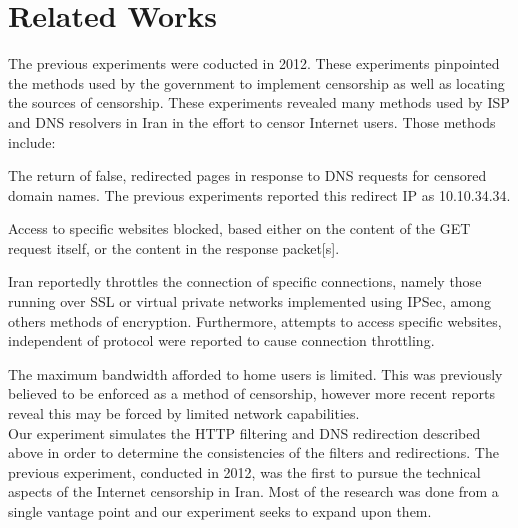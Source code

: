 \section{Related Works}\label{sec:relatedworks}

The previous experiments were coducted in 2012. These experiments pinpointed the methods used by the government to implement censorship as well as locating the sources of censorship. These experiments revealed many methods used by ISP and DNS resolvers in Iran in the effort to censor Internet users. Those methods include:


\item[DNS Redirection:] The return of false, redirected pages in response to DNS requests for censored domain names. The previous experiments reported this redirect IP as 10.10.34.34.\\
\item[HTTP Filtering:] Access to specific websites blocked, based either on the content of the GET request itself, or the content in the response packet[s].\\
\item[Connection Throttling:] Iran reportedly throttles the connection of specific connections, namely those running over SSL or virtual private networks implemented using IPSec, among others methods of encryption. Furthermore, attempts to access specific websites, independent of protocol were reported to cause connection throttling.\\
\item[Broadband Speed Limitations:] The maximum bandwidth afforded to home user\’s is limited. This was previously believed to be enforced as a method of censorship, however more recent reports reveal this may be forced by limited network capabilities.\\
Our experiment simulates the HTTP filtering and DNS redirection described above in order to determine the consistencies of the filters and redirections. The previous experiment, conducted in 2012, was the first to pursue the technical aspects of the Internet censorship in Iran. Most of the research was done from a single vantage point and our experiment seeks to expand upon them.\\
